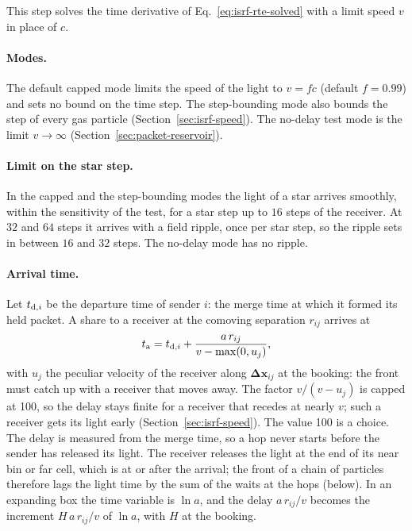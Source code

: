 This step solves the time derivative of Eq.~\eqref{eq:isrf-rte-solved} with a
limit speed $v$ in place of $c$.

\paragraph{Modes.} The default capped mode limits the speed of the light to
$v=fc$ (default $f=0.99$) and sets no bound on the time step. The
step-bounding mode also bounds the step of every gas particle
(Section~\ref{sec:isrf-speed}). The no-delay test mode is the limit
$v\to\infty$ (Section~\ref{sec:packet-reservoir}).

\paragraph{Limit on the star step.} In the capped and the step-bounding modes the
light of a star arrives smoothly, within the sensitivity of the test, for a star step up to
$16$ steps of the receiver. At $32$ and $64$ steps it arrives with a field ripple, once per
star step, so the ripple sets in between $16$ and $32$ steps. The no-delay mode has no
ripple.

\paragraph{Arrival time.} Let $t_{{\rm d},i}$ be the departure time of sender
$i$: the merge time at which it formed its held packet. A share to a
receiver at the comoving separation $r_{ij}$ arrives at
\begin{equation}
  t_{\rm a}=t_{{\rm d},i}+\frac{a\,r_{ij}}{v-\max(0,u_{j})},
  \label{eq:packet-arrival}
\end{equation}
with $u_j$ the peculiar velocity of the receiver along
$\boldsymbol{\Delta x}_{ij}$ at the booking: the front must catch up with a
receiver that moves away. The factor $v/(v-u_j)$ is capped at 100, so the delay
stays finite for a receiver that recedes at nearly $v$; such a receiver gets
its light early (Section~\ref{sec:isrf-speed}). The value 100 is a choice. The
delay is measured from the merge time, so a hop never starts before the sender
has released its light. The receiver releases the light at the end of its near
bin or far cell, which is at or after the arrival; the front of a chain of
particles therefore lags the light time by the sum of the waits at the hops
(below). In an expanding box the time
variable is $\ln a$, and the delay $a\,r_{ij}/v$ becomes the increment
$H\,a\,r_{ij}/v$ of $\ln a$, with $H$ at the booking.

